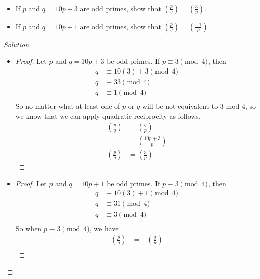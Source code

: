 \documentclass[11pt]{article}
\newcommand\leg[2]{\left(\frac{#1}{#2}\right)}
\newenvironment{problem}[2][Problem]{\begin{trivlist}
\item[\hskip \labelsep {\bfseries #1}\hskip \labelsep {\bfseries #2.}]}{\end{trivlist}}
\newenvironment{solution}
  {\renewcommand\qedsymbol{$~$}\begin{proof}[Solution]$ $\par\nobreak\ignorespaces}
  {\end{proof}}
\begin{document}
\begin{problem}{5}
~\\
\begin{itemize}
  \item [(a)] If $p$ and $q=10p+3$ are odd primes, show that $\leg{p}{q}=\leg{3}{p}$.
  \item [(b)] If $p$ and $q=10p+1$ are odd primes, show that $\leg{p}{q}=\leg{-1}{p}$
\end{itemize}
\end{problem}

\begin{solution}
  \renewcommand\qedsymbol{$\square$}
  \begin{itemize}
    \item [(a)]
          \begin{proof}
            Let $p$ and $q=10p+3$ be odd primes. If $p\equiv 3\pmod{4}$, then
            \begin{align*}
              q & \equiv 10(3)+3 \pmod{4} \\
              q & \equiv 33 \pmod{4}      \\
              q & \equiv 1 \pmod{4}       \\
            \end{align*}
            So no matter what at least one of $p$ or $q$ will be not equivalent to 3 mod 4, so we know that we can apply quadratic reciprocity as follows,
            \begin{align*}
              \leg{p}{q} & = \leg{q}{p}     \\
                         & = \leg{10p+3}{p} \\
              \leg{p}{q} & = \leg{3}{p}
            \end{align*}
          \end{proof}
    \item [(b)] \begin{proof}
            Let $p$ and $q=10p+1$ be odd primes. If $p\equiv 3\pmod{4}$, then
            \begin{align*}
              q & \equiv 10(3)+1 \pmod{4} \\
              q & \equiv 31 \pmod{4}      \\
              q & \equiv 3 \pmod{4}       \\
            \end{align*}
            So when $p\equiv 3\pmod{4}$, we have
            \begin{align*}
              \leg{p}{q} & = -\leg{q}{p}     \\

\end{align*}
\end{proof}
\end{itemize}
\end{solution}
\end{document}
